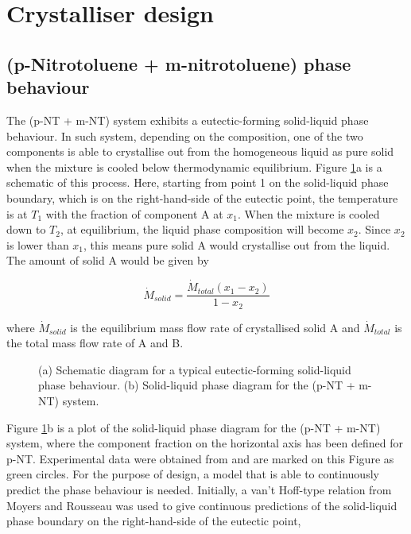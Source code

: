 \section{Crystalliser design}

\subsection{(p-Nitrotoluene + m-nitrotoluene) phase behaviour}

The (p-NT + m-NT) system exhibits a eutectic-forming solid-liquid phase behaviour. In such system, depending on the composition, one of the two components is able to crystallise out from the homogeneous liquid as pure solid when the mixture is cooled below thermodynamic equilibrium. \cite{seader_separation_2011} Figure \ref{fig:eutectic schematic}a is a schematic of this process. Here, starting from point 1 on the solid-liquid phase boundary, which is on the right-hand-side of the eutectic point, the temperature is at $T_1$ with the fraction of component A at $x_1$. When the mixture is cooled down to $T_2$, at equilibrium, the liquid phase composition will become $x_2$. Since $x_2$ is lower than $x_1$, this means pure solid A would crystallise out from the liquid. The amount of solid A would be given by

\begin{equation}\label{eq:amount solid A equilibrium}
    \dot{M}_{solid} = \frac{\dot{M}_{total} (x_1 - x_2)}{1 - x_2}
\end{equation}

\noindent where $\dot{M}_{solid}$ is the equilibrium mass flow rate of crystallised solid A and $\dot{M}_{total}$ is the total mass flow rate of A and B. 

\begin{figure}[h]
    \centering
    
    \caption{(a) Schematic diagram for a typical eutectic-forming solid-liquid phase behaviour. (b) Solid-liquid phase diagram for the (p-NT + m-NT) system.}
    \label{fig:eutectic schematic}
\end{figure}

Figure \ref{fig:eutectic schematic}b is a plot of the solid-liquid phase diagram for the (p-NT + m-NT) system, where the component fraction on the horizontal axis has been defined for p-NT. Experimental data were obtained from \cite{detherm} and are marked on this Figure as green circles. For the purpose of design, a model that is able to continuously predict the phase behaviour is needed. Initially, a van't Hoff-type relation from Moyers and Rousseau was used to give continuous predictions of the solid-liquid phase boundary on the right-hand-side of the eutectic point, \cite{Moyers and Rousseau}

